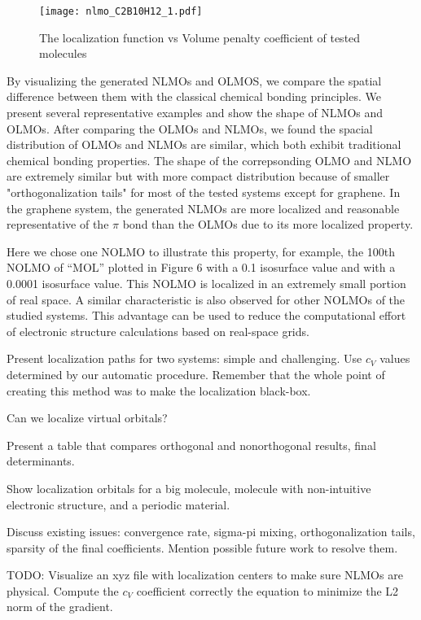 \documentclass[aps,prl,reprint,amsmath,amssymb]{revtex4-1}
\begin{document}
\begin{figure}[htbp]
\texttt{[image: nlmo\_C2B10H12\_1.pdf]} 
  \caption{The localization function vs Volume penalty coefficient of tested molecules}
\end{figure}

By visualizing the generated NLMOs and OLMOS, we compare the spatial difference between them with the classical chemical bonding principles.
We present several representative examples and show the shape of NLMOs and OLMOs.
After comparing the OLMOs and NLMOs, we found the spacial distribution of OLMOs and NLMOs are similar, which both exhibit traditional chemical bonding properties.
The shape of the correpsonding OLMO and NLMO are extremely similar  but with more compact distribution because of smaller "orthogonalization tails" for most of the tested systems except for graphene. 
In the graphene system, the generated NLMOs are more localized and reasonable representative of the $\pi$ bond than the OLMOs due to its more localized property.

Here we chose one NOLMO to illustrate this property, for example, the 100th NOLMO of “MOL” plotted in Figure 6 with a 0.1 isosurface value and with a 0.0001 isosurface value. This NOLMO is localized in an extremely small portion of real space. A similar characteristic is also observed for other NOLMOs of the studied systems. This advantage can be used to reduce the computational effort of electronic structure calculations based on real-space grids.


Present localization paths for two systems: simple and challenging. Use $c_V$ values determined by our automatic procedure. Remember that the whole point of creating this method was to make the localization black-box.

Can we localize virtual orbitals?

Present a table that compares orthogonal and nonorthogonal results, final determinants.

Show localization orbitals for a big molecule, molecule with non-intuitive electronic structure, and a periodic material.

Discuss existing issues: convergence rate, sigma-pi mixing, orthogonalization tails, sparsity of the final coefficients. Mention possible future work to resolve them.

TODO: Visualize an xyz file with localization centers to make sure NLMOs are physical. Compute the $c_V$ coefficient correctly the equation to minimize the L2 norm of the gradient.
\end{document}
